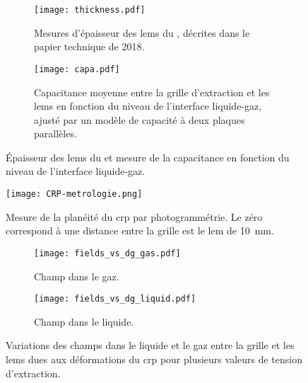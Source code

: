       \begin{figure}[htbp]
        \centering
        \begin{subfigure}[t]{0.48\textwidth}
          \centering
          \texttt{[image: thickness.pdf]}
          \caption{\label{fig::lem_thicnkess_311}Mesures d'épaisseur des \glspl{lem} du \TOO{}, décrites dans le papier technique de 2018\cite{Aimard2018}.}
        \end{subfigure}\hfill
        \begin{subfigure}[t]{0.48\textwidth}
          \centering
          \texttt{[image: capa.pdf]}
          \caption{\label{fig::capa}Capacitance moyenne entre la grille d'extraction et les \glspl{lem} en fonction du niveau de l'interface liquide-gaz, ajusté par un modèle de capacité à deux plaques parallèles.}
        \end{subfigure}
        \caption[Épaisseur des \glspl{lem} du \TOO{} et mesure de la capacitance en fonction du niveau de l'interface liquide-gaz]{Épaisseur des \glspl{lem} du \TOO{} et mesure de la capacitance en fonction du niveau de l'interface liquide-gaz.}
      \end{figure}

      \begin{figure}[htbp]
        \centering
        \texttt{[image: CRP-metrologie.png]}
        \caption[Mesure de la planéité du CRP]{\label{fig::crp_var}Mesure de la planéité du \gls{crp} par photogrammétrie. Le zéro correspond à une distance entre la grille est le \gls{lem} de \SI{10}{\milli\meter}.}
      \end{figure}


      \begin{figure}[htbp]
        \centering
        \begin{subfigure}[t]{0.48\textwidth}
          \centering
          \texttt{[image: fields\_vs\_dg\_gas.pdf]}
          \caption{Champ dans le gaz.}
        \end{subfigure}\hfill
        \begin{subfigure}[t]{0.48\textwidth}
          \centering
          \texttt{[image: fields\_vs\_dg\_liquid.pdf]}
          \caption{Champ dans le liquide.}
        \end{subfigure}
        \caption[Variations des champs d'extraction dues à la déformation du CRP]{\label{fig::fields_vs_dg}Variations des champs dans le liquide et le gaz entre la grille et les \glspl{lem} dues aux déformations du \gls{crp} pour plusieurs valeurs de tension d'extraction.}
      \end{figure}

